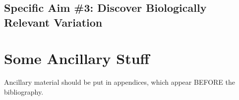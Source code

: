 \documentclass[11pt,proposal]{ucthesis}
\begin{document}


\section{Specific Aim \#3: Discover Biologically Relevant Variation}




\appendix
\chapter{Some Ancillary Stuff}

Ancillary material should be put in appendices, which appear BEFORE the
bibliography. 


\nocite{*}

\def\baselinestretch{1.0}\large\normalsize



\end{document}
